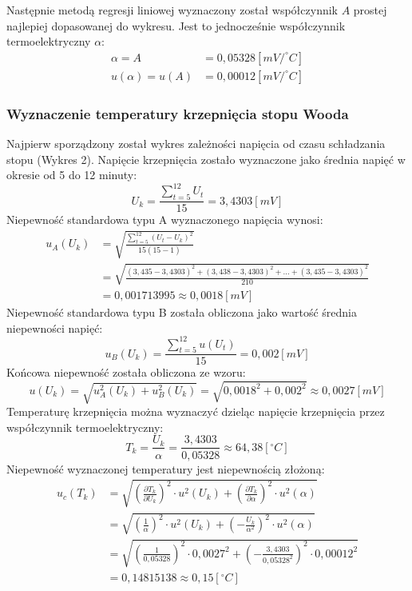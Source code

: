 \documentclass[polish, 11pt, a4paper]{article}
\begin{document}
		Następnie metodą regresji liniowej wyznaczony został współczynnik \(A\) prostej najlepiej dopasowanej do wykresu. 
		Jest to jednocześnie współczynnik termoelektryczny \(\alpha\):
		\begin{align*}
			\alpha 		= A		&= 0,05328[mV/^\circ C]\\
			u(\alpha) 	= u(A)	&= 0,00012[mV/^\circ C]
		\end{align*}
		
	\subsubsection{Wyznaczenie temperatury krzepnięcia stopu Wooda}
		Najpierw sporządzony został wykres zależności napięcia od czasu schładzania stopu (Wykres 2). Napięcie krzepnięcia zostało wyznaczone jako średnia napięć w okresie od 5 do 12 minuty:
		\begin{displaymath}
			U_k=\frac{\sum_{t=5}^{12}U_t}{15}=3,4303[mV]
		\end{displaymath}
		Niepewność standardowa typu A wyznaczonego napięcia wynosi:
		\begin{align*}
		u_A(U_k)&=\sqrt{\frac{\sum_{t=5}^{12} (U_{t}-U_k)^2}{15(15-1)}}\\
		&=\sqrt{\frac{(3,435-3,4303)^2+(3,438-3,4303)^2+\dots+(3,435-3,4303)^2}{210}}\\
		&=0,001713995\approx 0,0018 [mV]
		\end{align*}
		Niepewność standardowa typu B została obliczona jako wartość średnia niepewności napięć:
		\begin{displaymath}
			u_B(U_k) = \frac{\sum_{t=5}^{12}u(U_t)}{15}=0,002[mV]
		\end{displaymath} 
		Końcowa niepewność została obliczona ze wzoru:
		\begin{displaymath}
			u(U_k)	=\sqrt{u_A^2(U_k)+u_B^2(U_k)}=\sqrt{0,0018^2+0,002^2} \approx 0,0027[mV]
		\end{displaymath}
		Temperaturę krzepnięcia można wyznaczyć dzieląc napięcie krzepnięcia przez współczynnik termoelektryczny:
		\begin{displaymath}
			T_k=\frac{U_k}{\alpha}=\frac{3,4303}{0,05328} \approx 64,38[^\circ C]
		\end{displaymath}
		Niepewność wyznaczonej temperatury jest niepewnością złożoną:
		\begin{align*}
		u_c(T_k)	&=\sqrt{\left(\frac{\partial T_k}{\partial U_k}\right)^2\cdot u^2(U_k)+\left(\frac{\partial T_k}{\partial \alpha}\right)^2\cdot u^2(\alpha)}\\
		&=\sqrt{\left(\frac{1}{\alpha}\right)^2\cdot u^2(U_k) + \left(-\frac{U_k}{\alpha^2}\right)^2\cdot u^2(\alpha)}\\
		&=\sqrt{\left(\frac{1}{0,05328}\right)^2\cdot 0,0027^2+\left(-\frac{3,4303}{0,05328^2}\right)^2\cdot 0,00012^2}\\[10pt]
		&=0,14815138\approx 0,15[^\circ C]
		\end{align*}
		
\end{document}
